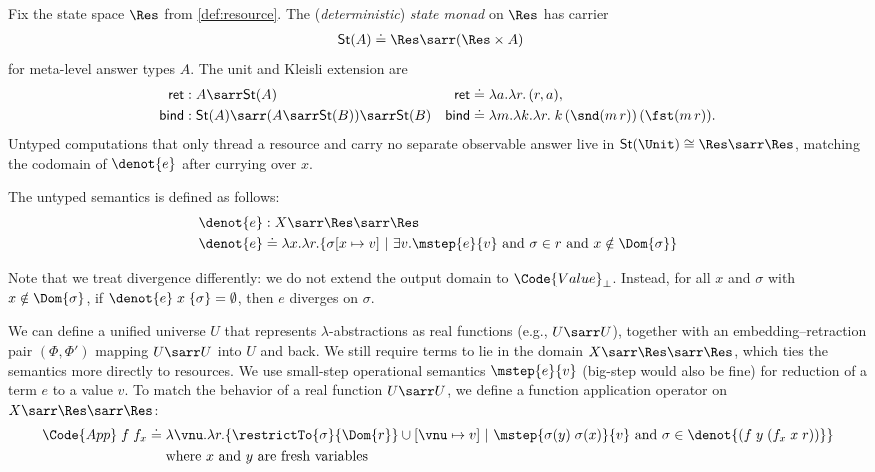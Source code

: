 \begin{definition}\label{def:resource-state-monad}
  Fix the state space $\Res$ from \autoref{def:resource}.
  The (\emph{deterministic}) \emph{state monad} on $\Res$ has carrier
  \begin{align*}
    \mathsf{St}(A) &\doteq \Res \sarr (\Res \times A)
  \end{align*}
  for meta-level answer types $A$.
  The unit and Kleisli extension are
  \begin{align*}
    \mathsf{ret} &: A \sarr \mathsf{St}(A)
    &\mathsf{ret} &\doteq \lambda a.\lambda r.\,(r,a),
    \\
    \mathsf{bind} &: \mathsf{St}(A) \sarr (A \sarr \mathsf{St}(B)) \sarr \mathsf{St}(B)
    &\mathsf{bind} &\doteq \lambda m.\lambda k.\lambda r.\; k\,(\snd(m\,r))\,(\fst(m\,r)).
  \end{align*}
  Untyped computations that only thread a resource and carry no separate observable answer
  live in $\mathsf{St}(\Unit) \cong \Res \sarr \Res$, matching the codomain of $\denot{e}$ after
  currying over $x$.
\end{definition}

\begin{definition}
  The untyped semantics is defined as follows:
  \begin{align*}
    \denot{e} &: X \sarr \Res \sarr \Res 
    \\\denot{e} &\doteq \lambda x.\lambda r. \{ \sigma[x\mapsto v] ~|~ \exists v. \mstep{e}{v} \text{ and } \sigma \in r \text{ and } x \notin \Dom{\sigma} \}
  \end{align*}
\end{definition}
Note that we treat divergence differently: we do not extend the output domain to $\Code{Value}_\bot$. Instead, for all $x$ and $\sigma$ with $x\notin \Dom{\sigma}$, if $\denot{e}\;x\;\{\sigma\} = \emptyset$, then $e$ diverges on $\sigma$.

We can define a unified universe $U$ that represents $\lambda$-abstractions as real functions (e.g., $U \sarr U$), together with an embedding--retraction pair $(\Phi, \Phi')$ mapping $U \sarr U$ into $U$ and back. We still require terms to lie in the domain $X \sarr \Res \sarr \Res$, which ties the semantics more directly to resources. We use small-step operational semantics $\mstep{e}{v}$ (big-step would also be fine) for reduction of a term $e$ to a value $v$. To match the behavior of a real function $U \sarr U$, we define a function application operator on $X \sarr \Res \sarr \Res$:
\begin{align*}
  \Code{App}\;f\;f_x &\doteq \lambda \vnu.\lambda r. \{ \restrictTo{\sigma}{\Dom{r}}\cup[\vnu \mapsto v] ~|~ \mstep{\sigma(y)\;\sigma(x)}{v} \text{ and } \sigma \in \denot{(f\;y\;(f_x\;x\;r))} \} 
  \\&\quad \text{ where $x$ and $y$ are fresh variables}
\end{align*}\noindent

